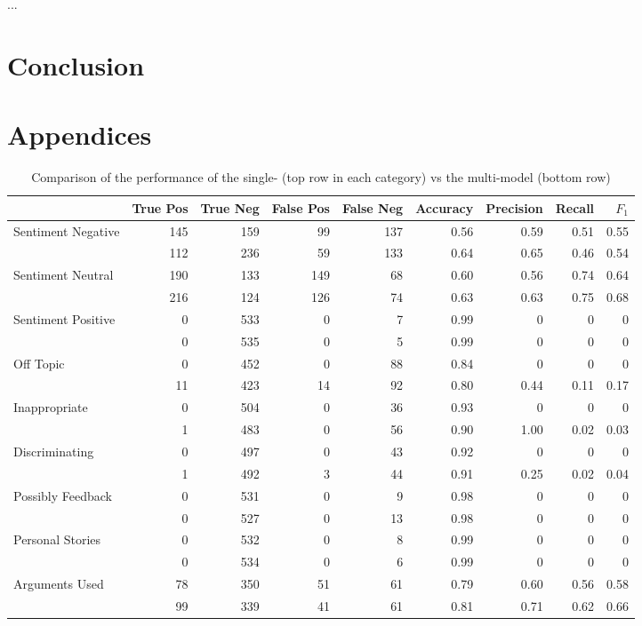 \documentclass[11pt,a4paper]{article}
\begin{document}
...

\section{Conclusion}




\appendix

\section{Appendices}
\label{sec:appendix}

\begin{table}[t!]
	\centering\small
	\begin{tabular}{l r r r r r r r r}
		& True Pos & True Neg & False Pos & False Neg & Accuracy & Precision & Recall & $F_1$ \\
		\hline
		Sentiment Negative & 145 & 159 & 99 & 137 & 0.56 & 0.59 & 0.51 & 0.55 \\
		& 112 & 236 & 59 & 133 & 0.64 & 0.65 & 0.46 & 0.54 \\
		\hline
		Sentiment Neutral & 190 & 133 & 149 & 68 & 0.60 & 0.56 & 0.74 & 0.64 \\
		& 216 & 124 & 126 & 74 & 0.63 & 0.63 & 0.75 & 0.68 \\
		\hline
		Sentiment Positive & 0 & 533 & 0 & 7 & 0.99 & 0 & 0 & 0 \\
		& 0 & 535 & 0 & 5 & 0.99 & 0 & 0 & 0 \\
		\hline
		Off Topic & 0 & 452 & 0 & 88 & 0.84 & 0 & 0 & 0 \\
		& 11 & 423 & 14 & 92 & 0.80 & 0.44 & 0.11 & 0.17 \\
		\hline
		Inappropriate & 0 & 504 & 0 & 36 & 0.93 & 0 & 0 & 0 \\
		& 1 & 483 & 0 & 56 & 0.90 & 1.00 & 0.02 & 0.03 \\
		\hline
		Discriminating & 0 & 497 & 0 & 43 & 0.92 & 0 & 0 & 0 \\
		& 1 & 492 & 3 & 44 & 0.91 & 0.25 & 0.02 & 0.04 \\
		\hline
		Possibly Feedback & 0 & 531 & 0 & 9 & 0.98 & 0 & 0 & 0 \\
		& 0 & 527 & 0 & 13 & 0.98 & 0 & 0 & 0 \\
		\hline
		Personal Stories & 0 & 532 & 0 & 8 & 0.99 & 0 & 0 & 0 \\
		& 0 & 534 & 0 & 6 & 0.99 & 0 & 0 & 0 \\
		\hline
		Arguments Used & 78 & 350 & 51 & 61 & 0.79 & 0.60 & 0.56 & 0.58\\
		& 99 & 339 & 41 & 61 & 0.81 & 0.71 & 0.62 & 0.66 \\
	\end{tabular}
	\caption{Comparison of the performance of the single- (top row in each category) vs the multi-model (bottom row)}
	\label{tab:results}
\end{table}
\end{document}
